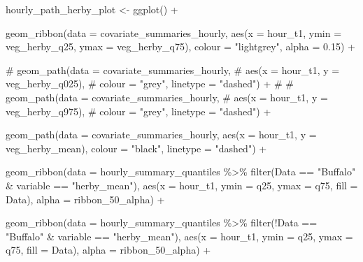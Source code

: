 \documentclass[
  letterpaper,
  DIV=11,
  numbers=noendperiod]{scrartcl}
\newenvironment{Shaded}{\begin{snugshade}}{\end{snugshade}}
\newcommand{\AttributeTok}[1]{\textcolor[rgb]{0.40,0.45,0.13}{#1}}
\newcommand{\CommentTok}[1]{\textcolor[rgb]{0.37,0.37,0.37}{#1}}
\newcommand{\FloatTok}[1]{\textcolor[rgb]{0.68,0.00,0.00}{#1}}
\newcommand{\FunctionTok}[1]{\textcolor[rgb]{0.28,0.35,0.67}{#1}}
\newcommand{\NormalTok}[1]{\textcolor[rgb]{0.00,0.23,0.31}{#1}}
\newcommand{\OtherTok}[1]{\textcolor[rgb]{0.00,0.23,0.31}{#1}}
\newcommand{\SpecialCharTok}[1]{\textcolor[rgb]{0.37,0.37,0.37}{#1}}
\newcommand{\StringTok}[1]{\textcolor[rgb]{0.13,0.47,0.30}{#1}}
\begin{document}
\begin{Shaded}
\begin{Highlighting}[]
\NormalTok{hourly\_path\_herby\_plot }\OtherTok{\textless{}{-}} \FunctionTok{ggplot}\NormalTok{() }\SpecialCharTok{+}
  
  \FunctionTok{geom\_ribbon}\NormalTok{(}\AttributeTok{data =}\NormalTok{ covariate\_summaries\_hourly,}
              \FunctionTok{aes}\NormalTok{(}\AttributeTok{x =}\NormalTok{ hour\_t1, }\AttributeTok{ymin =}\NormalTok{ veg\_herby\_q25, }\AttributeTok{ymax =}\NormalTok{ veg\_herby\_q75),}
              \AttributeTok{colour =} \StringTok{"lightgrey"}\NormalTok{, }\AttributeTok{alpha =} \FloatTok{0.15}\NormalTok{) }\SpecialCharTok{+}
  
  \CommentTok{\# geom\_path(data = covariate\_summaries\_hourly,}
  \CommentTok{\#           aes(x = hour\_t1, y = veg\_herby\_q025),}
  \CommentTok{\#           colour = "grey", linetype = "dashed") +}
  \CommentTok{\# }
  \CommentTok{\# geom\_path(data = covariate\_summaries\_hourly,}
  \CommentTok{\#           aes(x = hour\_t1, y = veg\_herby\_q975),}
  \CommentTok{\#           colour = "grey", linetype = "dashed") +}

  \FunctionTok{geom\_path}\NormalTok{(}\AttributeTok{data =}\NormalTok{ covariate\_summaries\_hourly,}
            \FunctionTok{aes}\NormalTok{(}\AttributeTok{x =}\NormalTok{ hour\_t1, }\AttributeTok{y =}\NormalTok{ veg\_herby\_mean),}
            \AttributeTok{colour =} \StringTok{"black"}\NormalTok{, }\AttributeTok{linetype =} \StringTok{"dashed"}\NormalTok{) }\SpecialCharTok{+}

  \FunctionTok{geom\_ribbon}\NormalTok{(}\AttributeTok{data =}\NormalTok{ hourly\_summary\_quantiles }\SpecialCharTok{\%\textgreater{}\%} 
                \FunctionTok{filter}\NormalTok{(Data }\SpecialCharTok{==} \StringTok{"Buffalo"} \SpecialCharTok{\&}\NormalTok{ variable }\SpecialCharTok{==} \StringTok{"herby\_mean"}\NormalTok{),}
              \FunctionTok{aes}\NormalTok{(}\AttributeTok{x =}\NormalTok{ hour\_t1, }\AttributeTok{ymin =}\NormalTok{ q25, }\AttributeTok{ymax =}\NormalTok{ q75, }\AttributeTok{fill =}\NormalTok{ Data),}
              \AttributeTok{alpha =}\NormalTok{ ribbon\_50\_alpha) }\SpecialCharTok{+}

  \FunctionTok{geom\_ribbon}\NormalTok{(}\AttributeTok{data =}\NormalTok{ hourly\_summary\_quantiles }\SpecialCharTok{\%\textgreater{}\%} 
                \FunctionTok{filter}\NormalTok{(}\SpecialCharTok{!}\NormalTok{Data }\SpecialCharTok{==} \StringTok{"Buffalo"} \SpecialCharTok{\&}\NormalTok{ variable }\SpecialCharTok{==} \StringTok{"herby\_mean"}\NormalTok{),}
              \FunctionTok{aes}\NormalTok{(}\AttributeTok{x =}\NormalTok{ hour\_t1, }\AttributeTok{ymin =}\NormalTok{ q25, }\AttributeTok{ymax =}\NormalTok{ q75, }\AttributeTok{fill =}\NormalTok{ Data),}
              \AttributeTok{alpha =}\NormalTok{ ribbon\_50\_alpha) }\SpecialCharTok{+}
  

\end{Highlighting}
\end{Shaded}
\end{document}
